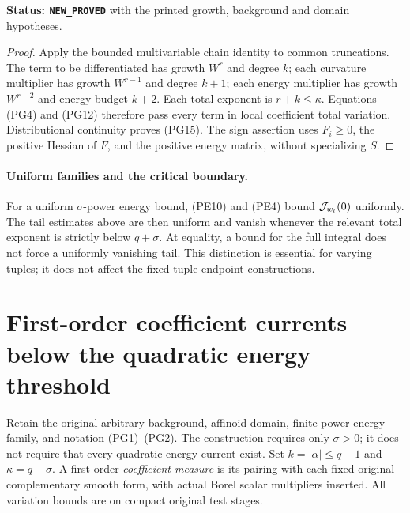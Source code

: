 \documentclass[11pt,a4paper]{article}
\numberwithin{equation}{section}
\theoremstyle{definition}
\theoremstyle{remark}
\begin{document}
\noindent\textbf{Status: \texttt{NEW\_PROVED}} with the
printed growth, background and domain hypotheses.

\begin{proof}
Apply the bounded multivariable chain identity to common
truncations. The term to be differentiated has growth $W^r$
and degree $k$; each curvature multiplier has growth
$W^{r-1}$ and degree $k+1$; each energy multiplier has growth
$W^{r-2}$ and energy budget $k+2$. Each total exponent is
$r+k\leq\kappa$. Equations (PG4) and (PG12) therefore pass
every term in local coefficient total variation.
Distributional continuity proves (PG15). The sign assertion
uses $F_i\geq0$, the positive Hessian of $F$, and the positive
energy matrix, without specializing $S$.
\end{proof}

\paragraph{Uniform families and the critical boundary.}
For a uniform $\sigma$-power energy bound, (PE10) and (PE4)
bound $ {\cal J}_{w_l}(0)$ uniformly. The tail estimates above
are then uniform and vanish whenever the relevant total
exponent is strictly below $q+\sigma$. At equality, a bound
for the full integral does not force a uniformly vanishing
tail. This distinction is essential for varying tuples;
it does not affect the fixed-tuple endpoint constructions.



\section{First-order coefficient currents below the quadratic energy threshold}
\label{sec:r11-first-order-power-currents}

Retain the original arbitrary background, affinoid domain,
finite power-energy family, and notation (PG1)--(PG2).
The construction requires only $\sigma>0$; it does not require
that every quadratic energy current exist.
Set $k=|\alpha|\leq q-1$ and $\kappa=q+\sigma$.
A first-order \emph{coefficient measure} is its pairing with
each fixed original complementary smooth form, with actual
Borel scalar multipliers inserted. All variation bounds
are on compact original test stages.
\end{document}
